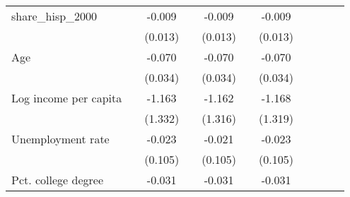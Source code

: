 {\begin{tabular}{l*{10}{c}}
\addlinespace
share\_hisp\_2000     &                     &      -0.009         &                     &      -0.009         &                     &      -0.009         &                     &                     &                     &                     \\
                    &                     &     (0.013)         &                     &     (0.013)         &                     &     (0.013)         &                     &                     &                     &                     \\
\addlinespace
Age                 &                     &      -0.070\sym{**} &                     &      -0.070\sym{**} &                     &      -0.070\sym{**} &                     &                     &                     &                     \\
                    &                     &     (0.034)         &                     &     (0.034)         &                     &     (0.034)         &                     &                     &                     &                     \\
\addlinespace
Log income per capita&                     &      -1.163         &                     &      -1.162         &                     &      -1.168         &                     &                     &                     &                     \\
                    &                     &     (1.332)         &                     &     (1.316)         &                     &     (1.319)         &                     &                     &                     &                     \\
\addlinespace
Unemployment rate   &                     &      -0.023         &                     &      -0.021         &                     &      -0.023         &                     &                     &                     &                     \\
                    &                     &     (0.105)         &                     &     (0.105)         &                     &     (0.105)         &                     &                     &                     &                     \\
\addlinespace
Pct. college degree &                     &      -0.031         &                     &      -0.031         &                     &      -0.031         &                     &                     &                     &                     \\

\end{tabular}}
